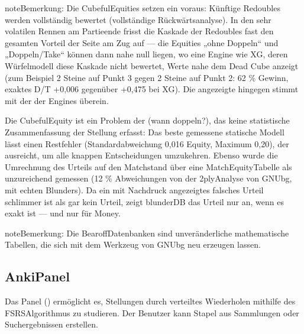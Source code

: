 \documentclass[letterpaper,10pt,german]{sphinxmanual}
\begin{document}
\begin{sphinxadmonition}{note}{Bemerkung:}
\sphinxAtStartPar
Die Cubeful\sphinxhyphen{}Equities setzen ein  voraus: Künftige Redoubles werden vollständig bewertet (vollständige Rückwärtsanalyse). In den sehr volatilen Rennen am Partieende frisst die Kaskade der Redoubles fast den gesamten Vorteil der Seite am Zug auf — die Equities „ohne Doppeln“ und „Doppeln/Take“ können dann nahe null liegen, wo eine Engine wie XG, deren Würfelmodell diese Kaskade nicht bewertet, Werte nahe dem Dead Cube anzeigt (zum Beispiel 2 Steine auf Punkt 3 gegen 2 Steine auf Punkt 2: 62 \% Gewinn, exaktes D/T +0,006 gegenüber +0,475 bei XG). Die angezeigte  hingegen stimmt mit der der Engines überein.
\end{sphinxadmonition}

\sphinxAtStartPar
{} Die Cubeful\sphinxhyphen{}Equity ist ein Problem der  (wann doppeln?), das keine statistische Zusammenfassung der Stellung erfasst: Das beste gemessene statische Modell lässt einen Restfehler (Standardabweichung 0,016 Equity, Maximum 0,20), der ausreicht, um alle knappen Entscheidungen umzukehren. Ebenso wurde die Umrechnung des Urteils auf den Matchstand über eine Match\sphinxhyphen{}Equity\sphinxhyphen{}Tabelle als unzureichend gemessen (12 \% Abweichungen von der 2\sphinxhyphen{}ply\sphinxhyphen{}Analyse von GNUbg, mit echten Blunders). Da ein mit Nachdruck angezeigtes falsches Urteil schlimmer ist als gar kein Urteil, zeigt blunderDB das Urteil nur an, wenn es exakt ist — und nur für Money.

\begin{sphinxadmonition}{note}{Bemerkung:}
\sphinxAtStartPar
Die Bearoff\sphinxhyphen{}Datenbanken sind unveränderliche mathematische Tabellen, die sich mit dem Werkzeug  von GNUbg neu erzeugen lassen.
\end{sphinxadmonition}


\subsection{Anki\sphinxhyphen{}Panel}
\label{\detokenize{manuel:panneau-anki}}\label{\detokenize{manuel:id10}}
\sphinxAtStartPar
Das Panel  () ermöglicht es, Stellungen durch verteiltes Wiederholen mithilfe des FSRS\sphinxhyphen{}Algorithmus zu studieren. Der Benutzer kann Stapel aus Sammlungen oder Suchergebnissen erstellen.
\end{document}
